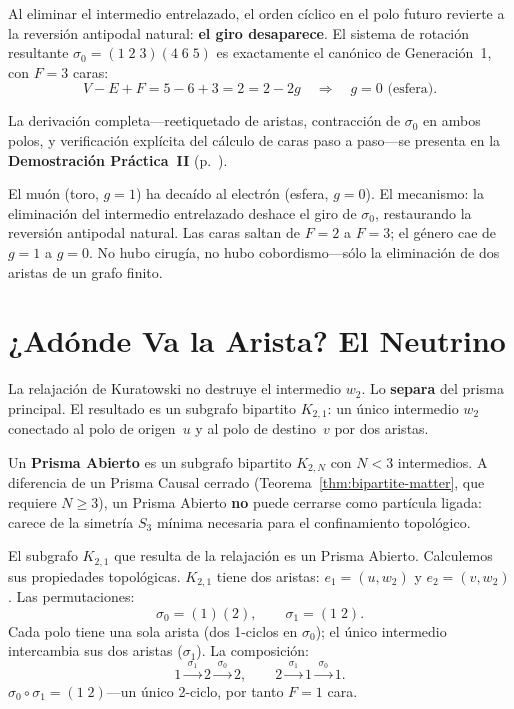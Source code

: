 \documentclass[11pt, a4paper, openany]{book}
\begin{document}
Al eliminar el intermedio entrelazado, el orden c\'iclico en el polo
futuro revierte a la reversi\'on antipodal natural: \textbf{el giro
desaparece}. El sistema de rotaci\'on resultante
$\sigma_0 = (1\;2\;3)(4\;6\;5)$ es exactamente el can\'onico de
Generaci\'on~1, con $F = 3$ caras:
\[
  V - E + F = 5 - 6 + 3 = 2 = 2 - 2g
  \quad\Longrightarrow\quad \boxed{g = 0}\text{ (esfera).}
\]

La derivaci\'on completa---reetiquetado de aristas, contracci\'on de
$\sigma_0$ en ambos polos, y verificaci\'on expl\'icita del c\'alculo de
caras paso a paso---se presenta en la
\textbf{Demostraci\'on Pr\'actica~II}
(p.~\pageref{sec:demo-muon}).

\begin{result}[title={La desintegraci\'on del mu\'on}]
El mu\'on (toro, $g = 1$) ha deca\'ido al electr\'on (esfera, $g = 0$).
El mecanismo: la eliminaci\'on del intermedio entrelazado deshace el giro
de $\sigma_0$, restaurando la reversi\'on antipodal natural. Las caras
saltan de $F = 2$ a $F = 3$; el g\'enero cae de $g = 1$ a $g = 0$. No
hubo cirug\'ia, no hubo cobordismo---s\'olo la eliminaci\'on de dos
aristas de un grafo finito.
\end{result}

\section{¿Adónde Va la Arista? El Neutrino}
\label{sec:neutrino}

La relajación de Kuratowski no destruye el intermedio $w_2$. Lo
\textbf{separa} del prisma principal. El resultado es un subgrafo
bipartito $K_{2,1}$: un \'unico intermedio $w_2$ conectado al polo
de origen~$u$ y al polo de destino~$v$ por dos aristas.

\begin{definition}
\label{def:open-prism}
Un \textbf{Prisma Abierto} es un subgrafo bipartito $K_{2,N}$ con
$N < 3$ intermedios. A diferencia de un Prisma Causal cerrado
(Teorema~\ref{thm:bipartite-matter}, que requiere $N \geq 3$), un
Prisma Abierto \textbf{no} puede cerrarse como part\'icula
ligada: carece de la simetr\'ia $S_3$ m\'inima necesaria para el
confinamiento topol\'ogico.
\end{definition}

El subgrafo $K_{2,1}$ que resulta de la relajaci\'on es un Prisma
Abierto. Calculemos sus propiedades topol\'ogicas. $K_{2,1}$ tiene
dos aristas: $e_1 = (u, w_2)$ y $e_2 = (v, w_2)$. Las permutaciones:
\[
  \sigma_0 = (1)(2), \qquad \sigma_1 = (1\;2).
\]
Cada polo tiene una sola arista (dos 1-ciclos en $\sigma_0$); el \'unico
intermedio intercambia sus dos aristas ($\sigma_1$). La composici\'on:
\[
  1 \xrightarrow{\;\sigma_1\;} 2 \xrightarrow{\;\sigma_0\;} 2,
  \qquad
  2 \xrightarrow{\;\sigma_1\;} 1 \xrightarrow{\;\sigma_0\;} 1.
\]
$\sigma_0 \circ \sigma_1 = (1\;2)$---un \'unico 2-ciclo, por tanto
$F = 1$ cara.
\end{document}
